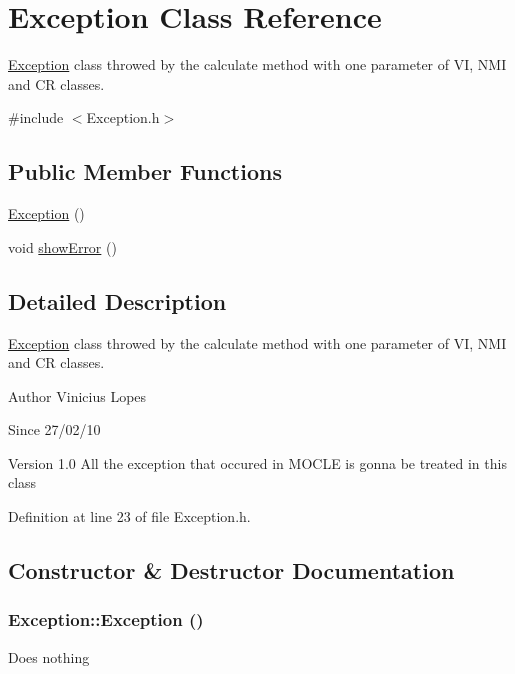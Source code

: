 \hypertarget{classException}{
\section{Exception Class Reference}
\label{classException}
}


\hyperlink{classException}{Exception} class throwed by the calculate method with one parameter of VI, NMI and CR classes.  


{\ttfamily \#include $<$Exception.h$>$}\subsection*{Public Member Functions}
\begin{DoxyCompactItemize}
\item 
\hyperlink{classException_a1b78336bb26edf8e784783cc150c5801}{Exception} ()
\item 
void \hyperlink{classException_aca2f9cfcfdfede80fc028a4150f0af48}{showError} ()
\end{DoxyCompactItemize}


\subsection{Detailed Description}
\hyperlink{classException}{Exception} class throwed by the calculate method with one parameter of VI, NMI and CR classes. \begin{DoxyAuthor}{Author}
Vinicius Lopes 
\end{DoxyAuthor}
\begin{DoxySince}{Since}
27/02/10 
\end{DoxySince}
\begin{DoxyVersion}{Version}
1.0 All the exception that occured in MOCLE is gonna be treated in this class 
\end{DoxyVersion}


Definition at line 23 of file Exception.h.

\subsection{Constructor \& Destructor Documentation}
\hypertarget{classException_a1b78336bb26edf8e784783cc150c5801}{
\subsubsection[{Exception}]{\setlength{\rightskip}{0pt plus 5cm}Exception::Exception ()}}
\label{classException_a1b78336bb26edf8e784783cc150c5801}
Does nothing 

